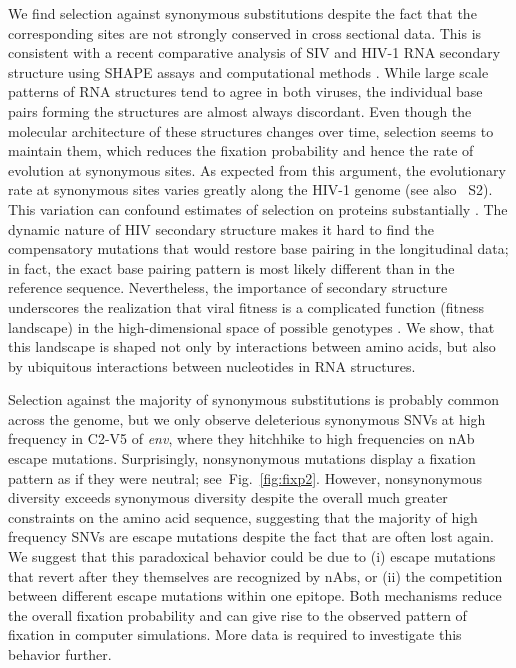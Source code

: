 \documentclass[11pt]{article}
\newcommand{\FIG}[1]{Fig.~\ref{fig:#1}}
\newcommand{\env}{\textit{env}}
\newcommand{\shankaregion}{C2-V5}
\newcommand{\syndiv}{2}
\begin{document}
We find selection against synonymous substitutions despite the
fact that the corresponding sites are not strongly conserved in
cross sectional data. This is consistent with a recent comparative
analysis of SIV and HIV-1 RNA secondary structure using SHAPE assays and
computational methods \citep{pollom_comparison_2013}. While large scale
patterns of RNA structures tend to agree in both viruses, the individual
base pairs forming the structures are almost always
discordant. Even though the molecular architecture of these structures
changes over time, selection seems to maintain them, which reduces the
fixation probability and hence the rate of evolution at synonymous
sites. As expected from this argument, the evolutionary rate
at synonymous sites varies greatly along the HIV-1 genome
\citep{mayrose_towards_2007} (see also \figurename~S\syndiv). This variation can confound estimates of
selection on proteins substantially \citep{ngandu_extensive_2008}. 
The dynamic nature of HIV secondary structure makes it hard to find the 
compensatory mutations that would restore base pairing in the
longitudinal data; in fact, the exact base pairing pattern is
most likely different than in the reference sequence. Nevertheless, the
importance of secondary structure underscores the realization that viral
fitness is a complicated function (fitness landscape) in the
high-dimensional space of possible genotypes
\citep{ferguson_translating_2013}. We show, that this landscape is shaped not
only by interactions between amino acids, but also by ubiquitous
interactions between nucleotides in RNA structures. 


Selection against the majority of synonymous substitutions is probably
common across the genome, but we only observe deleterious synonymous SNVs
at high frequency in \shankaregion{} of \env{}, where they hitchhike to
high frequencies on nAb escape mutations. Surprisingly, nonsynonymous
mutations display a fixation pattern as if they were neutral;
see~\FIG{fixp2}. However, nonsynonymous diversity exceeds
synonymous diversity despite the overall much greater constraints on the
amino acid sequence, suggesting that the majority of high frequency SNVs
are escape mutations despite the fact that are often lost again. We suggest that this
paradoxical behavior could be due to (i) escape
mutations that revert after they themselves are recognized by nAbs, or (ii)
the competition between different escape mutations within one epitope. 
Both mechanisms reduce the overall fixation probability and can
give rise to the observed pattern of fixation in computer
simulations. More data is required to investigate this behavior further.
\end{document}
